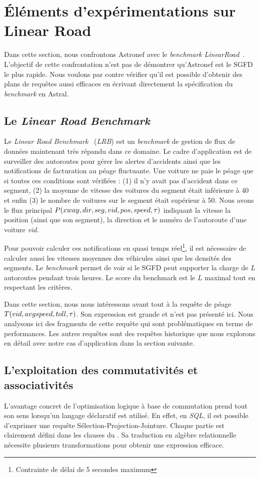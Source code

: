 \section{Éléments d'expérimentations sur Linear Road}\label{sec:valid:perfs:flux}
Dans cette section, nous confrontons Astronef avec le \textit{benchmark} \textit{LinearRoad}~\cite{Arasu:lrb}. L'objectif de cette confrontation n'est pas de démontrer qu'Astronef est le SGFD le plus rapide. Nous voulons par contre vérifier qu'il est possible d'obtenir des plans de requêtes aussi efficaces en écrivant directement la spécification du \textit{benchmark} en Astral.

\subsection{Le \textit{Linear Road Benchmark}}
Le \textit{Linear Road Benchmark}~\cite{Arasu:lrb} (\textit{LRB}) est un \textit{benchmark} de gestion de flux de données maintenant très répandu dans ce domaine. Le cadre d'application est de surveiller des autoroutes pour gérer les alertes d'accidents ainsi que les notifications de facturation au péage fluctuante. Une voiture ne paie le péage que si toutes ces conditions sont vérifiées : (1) il n'y avait pas d'accident dans ce segment, (2) la moyenne de vitesse des voitures du segment était inférieure à 40 et enfin (3) le nombre de voitures sur le segment était supérieur à 50. Nous avons le flux principal $P(xway, dir, seg, vid, pos, speed, \tau)$ indiquant la vitesse la position (ainsi que son segment), la direction et le numéro de l'autoroute d'une voiture \textit{vid}.

Pour pouvoir calculer ces notifications en quasi temps réel\footnote{Contrainte de délai de 5 secondes maximum}, il est nécessaire de calculer aussi les vitesses moyennes des véhicules ainsi que les densités des segments. Le \textit{benchmark} permet de voir si le SGFD peut supporter la charge de $L$ autoroutes pendant trois heures. Le score du benchmark est le $L$ maximal tout en respectant les critères.

Dans cette section, nous nous intéressons avant tout à la requête de péage $T(vid,avgspeed,toll,\tau)$. Son expression est grande et n'est pas présenté ici. Nous analysons ici des fragments de cette requête qui sont problématiques en terme de performances. Les autres requêtes sont des requêtes historique que nous explorons en détail avec notre cas d'application dans la section suivante.

\subsection{L'exploitation des commutativités et associativités}
L'avantage concret de l'optimisation logique à base de commutation prend tout son sens lorsqu'un langage déclaratif est utilisé. En effet, en \textit{SQL}, il est possible d'exprimer une requête Sélection-Projection-Jointure. Chaque partie est clairement défini dans les clauses du . Sa traduction en algèbre relationnelle nécessite plusieurs transformations pour obtenir une expression efficace.

